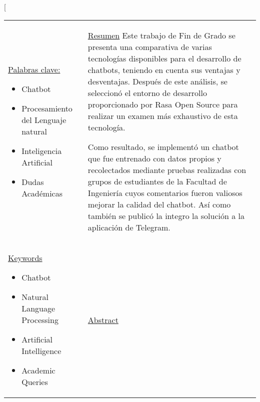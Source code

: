 \twocolumn[
	\begin{@twocolumnfalse}
		\maketitle
		\centering
		\begin{tabular}{p{6cm} p{10.3cm}} %
			\\ \hline

			\vspace{-0.1cm}
			\uline{Palabras clave:\hfill}
			\begin{itemize}
				\setlength\itemsep{-0.2em}
				\item Chatbot
				\item Procesamiento del Lenguaje natural
				\item Inteligencia Artificial
				\item Dudas Académicas
			\end{itemize}
			 & \vspace{-0.1cm}
			\uline{Resumen\hfill}
			Este trabajo de Fin de Grado se presenta una comparativa de varias
			tecnologías disponibles para el desarrollo de chatbots, teniendo en cuenta
			sus ventajas y
			desventajas. Después de este análisis, se seleccionó el entorno de
			desarrollo proporcionado por
			Rasa Open Source para realizar un examen más exhaustivo de esta tecnología.

			Como resultado, se implementó un chatbot que fue entrenado con datos propios y recolectados
			mediante pruebas realizadas con grupos de estudiantes de la Facultad de
			Ingeniería cuyos
			comentarios fueron valiosos mejorar la calidad del chatbot. Así como
			también se publicó la integro
			la solución a la aplicación de Telegram.
			\thispagestyle{firststyle}

			\text{}
			\\
			\uline{Keywords\hfill}
			\begin{itemize}
				\setlength\itemsep{-0.2em}
				\item Chatbot
				\item Natural Language Processing
				\item Artificial Intelligence
				\item Academic Queries
			\end{itemize}
			 &
			\uline{Abstract \hfill}


\end{tabular}
\end{@twocolumnfalse}
